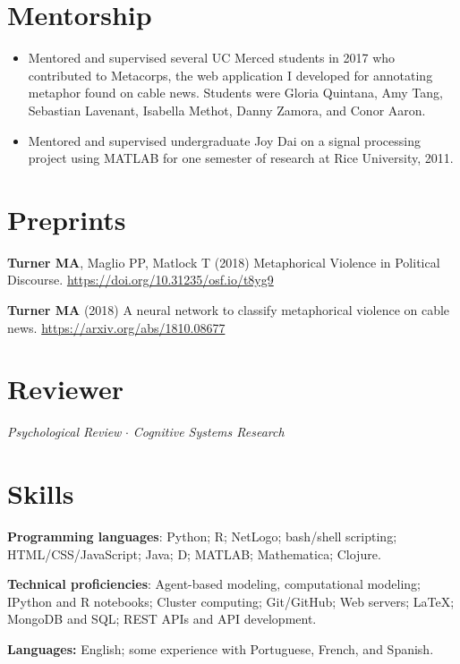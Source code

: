 \documentclass[letterpaper,11pt,oneside]{article}
\begin{document}
\noindent
\section*{\textcolor{gunmetal}{Mentorship}}
\begin{itemize}
  \item Mentored and supervised several UC Merced students in 2017 
    who contributed to
    Metacorps, the web application I developed for annotating metaphor found
    on cable news. Students were Gloria Quintana, Amy Tang, Sebastian Lavenant, Isabella Methot,
    Danny Zamora, and Conor Aaron.
  \item Mentored and supervised undergraduate Joy Dai on a signal processing project using MATLAB for
    one semester of research at Rice University, 2011.
\end{itemize}

\noindent
\section*{\textcolor{gunmetal}{Preprints}}
\begin{hangparas}{0.25in}{1}

  \textbf{Turner MA}, Maglio PP, Matlock T (2018) Metaphorical Violence in Political Discourse. \url{https://doi.org/10.31235/osf.io/t8yg9}

  \textbf{Turner MA} (2018) A neural network to classify metaphorical violence on cable news. \url{https://arxiv.org/abs/1810.08677}

\end{hangparas}

\noindent
\section*{\textcolor{gunmetal}{Reviewer}}

  \begin{hangparas}{0.25in}{1}
    \emph{Psychological Review} $\cdot$ \emph{Cognitive Systems Research}
  \end{hangparas}


\noindent
\section*{\textcolor{gunmetal}{Skills}}

\begin{hangparas}{0.25in}{1}
  \textbf{Programming languages}: Python; R; NetLogo; bash/shell scripting; 
  HTML/CSS/JavaScript; Java; D; MATLAB; Mathematica; Clojure.

  \textbf{Technical proficiencies}: Agent-based modeling, computational 
  modeling; IPython and R notebooks; Cluster computing;
  Git/GitHub; Web servers; \LaTeX; MongoDB and SQL; REST APIs and API
  development.

  \textbf{Languages:} English; some experience with Portuguese, French,
  and Spanish.
\end{hangparas}
\end{document}

